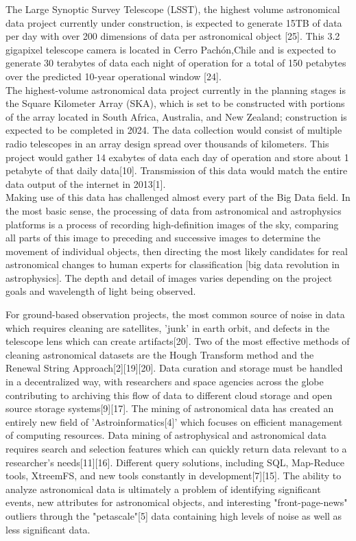 \documentclass[sigconf]{acmart}
\begin{document}
The Large Synoptic Survey Telescope (LSST), the highest volume astronomical data project currently under construction, is expected to generate 15TB of data per day with over 200 dimensions of data per astronomical object [25]. This 3.2 gigapixel telescope camera is located in Cerro Pachón,Chile and is expected to generate 30 terabytes of data each night of operation for a total of 150 petabytes over the predicted 10-year operational window [24]. \\

The highest-volume astronomical data project currently in the planning stages is the Square Kilometer Array (SKA), which is set to be constructed with portions of the array located in South Africa, Australia, and New Zealand; construction is expected to be completed in 2024. The data collection would consist of multiple radio telescopes in an array design spread over thousands of kilometers. This project would gather 14 exabytes of data each day of operation and store about 1 petabyte of that daily data[10]. Transmission of this data would match the entire data output of the internet in 2013[1]. \\

Making use of this data has challenged almost every part of the Big Data field. In the most basic sense, the processing of data from astronomical and astrophysics platforms is a process of recording high-definition images of the sky, comparing all parts of this image to preceding and successive images to determine the movement of individual objects, then directing the most likely candidates for real astronomical changes to human experts for classification [big data revolution in astrophysics]. The depth and detail of images varies depending on the project goals and wavelength of light being observed. 

For ground-based observation projects, the most common source of noise in data which requires cleaning are satellites, 'junk' in earth orbit, and defects in the telescope lens which can create artifacts[20]. Two of the most effective methods of cleaning astronomical datasets are the Hough Transform method and the Renewal String Approach[2][19][20]. Data curation and storage must be handled in a decentralized way, with researchers and space agencies across the globe contributing to archiving this flow of data to different cloud storage and open source storage systems[9][17]. The mining of astronomical data has created an entirely new field of 'Astroinformatics[4]' which focuses on efficient management of computing resources. Data mining of astrophysical and astronomical data requires search and selection features which can quickly return data relevant to a researcher's needs[11][16]. Different query solutions, including SQL, Map-Reduce tools, XtreemFS, and new tools constantly in development[7][15]. The ability to analyze astronomical data is ultimately a problem of identifying significant events, new attributes for astronomical objects, and interesting "front-page-news" outliers through the "petascale"[5] data containing high levels of noise as well as less significant data.
 
\end{document}
